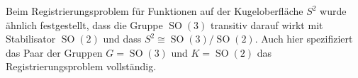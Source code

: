 Beim Registrierungsproblem für Funktionen auf der Kugeloberfläche
$S^2$ wurde ähnlich festgestellt, dass die Gruppe $\operatorname{SO}(3)$
transitiv darauf wirkt mit Stabilisator $\operatorname{SO}(2)$ und
dass $S^2\cong \operatorname{SO}(3)/\operatorname{SO}(2)$.
Auch hier spezifiziert das Paar der Gruppen $G=\operatorname{SO}(3)$
und $K=\operatorname{SO}(2)$ das Registrierungsproblem vollständig.



